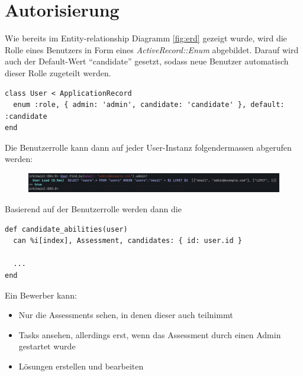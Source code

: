 \section{Autorisierung}

Wie bereits im Entity-relationship Diagramm \ref{fig:erd} gezeigt wurde, wird die Rolle eines Benutzers in Form eines \emph{ActiveRecord::Enum} abgebildet.
Darauf wird auch der Default-Wert \enquote{candidate} gesetzt, sodass neue Benutzer automatisch dieser Rolle zugeteilt werden.

\begin{codebox}
\begin{verbatim}
class User < ApplicationRecord
  enum :role, { admin: 'admin', candidate: 'candidate' }, default: :candidate
end
\end{verbatim}
\end{codebox}

Die Benutzerrolle kann dann auf jeder User-Instanz folgendermassen abgerufen werden:

\begin{figure}[H]
  \centering
  \includegraphics[width=\textwidth]{images/enum.png}
\end{figure}

Basierend auf der Benutzerrolle werden dann die 

\begin{codebox}
\begin{verbatim}
def candidate_abilities(user)
  can %i[index], Assessment, candidates: { id: user.id }

  ...
end
\end{verbatim}
\end{codebox}

Ein Bewerber kann:
\begin{itemize}
  \item Nur die Assessments sehen, in denen dieser auch teilnimmt
  \item Tasks ansehen, allerdings erst, wenn das Assessment durch einen Admin gestartet wurde
  \item Lösungen erstellen und bearbeiten
\end{itemize}
